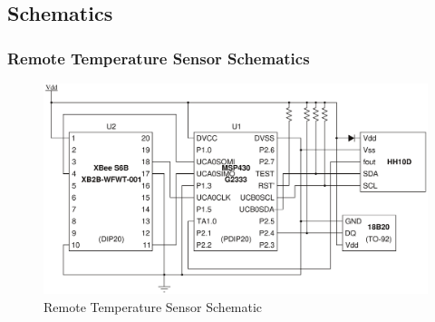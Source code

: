 \subsection{Schematics}
\subsubsection{Remote Temperature Sensor Schematics}
\begin{figure}[htb]
\centering
\includegraphics[width=.9\textwidth]{temp-schematic.pdf}
\caption{Remote Temperature Sensor Schematic}
\label{fig:RTSschematic}
\end{figure}